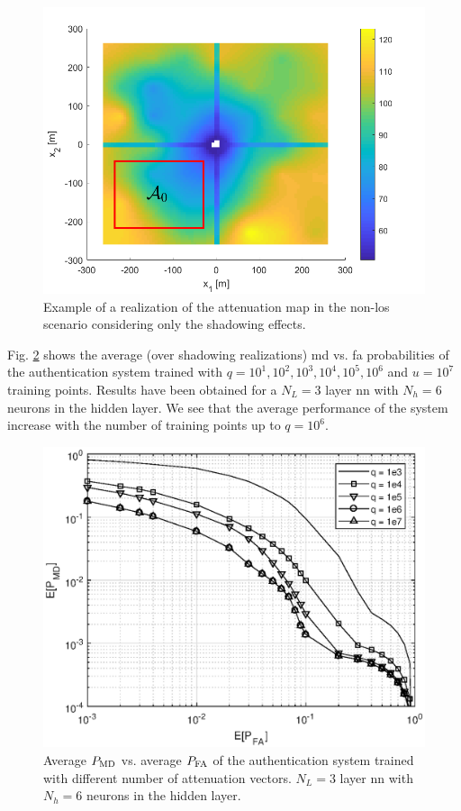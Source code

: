 \documentclass[conference]{IEEEtran}
\begin{document}
\begin{figure}[t]
    \centering
    \includegraphics[width=0.9\columnwidth]{surfColorato.png}
    \caption{Example of a realization of the attenuation map in the non-\ac{los} scenario considering only the shadowing effects.}
    \label{fig:trueMap}
\end{figure}

Fig. \ref{fig:n_train} shows the average (over shadowing realizations) \ac{md} vs. \ac{fa} probabilities of the authentication system trained with $q = 10^1, 10^2, 10^3, 10^4, 10^5, 10^6$ and $u=10^7$ training points. Results have been obtained for a $N_L=3$ layer \ac{nn} with $N_h=6$ neurons in the hidden layer. We see that the average performance of the system increase with the number of training points up to $q=10^6$.

\begin{figure}[t]
    \centering
    \includegraphics[width=0.9\columnwidth]{mean_maps.eps}
    \caption{Average $P_{\rm MD}$ vs. average $P_{\rm FA}$ of the authentication system trained with different number of attenuation vectors. $N_L=3$ layer \ac{nn} with $N_h=6$ neurons in the hidden layer.}
    \label{fig:n_train}
\end{figure}
\end{document}
